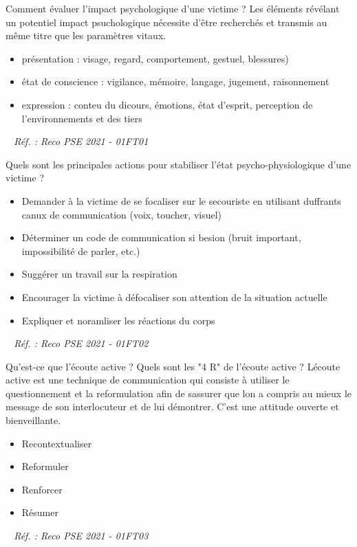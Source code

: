 \documentclass[grid,avery5371,landscape]{flashcards}
\makeatletter
\newcounter{nocarte}
\newcommand{\categ}[1]{%
  \def\@categ{#1}%
  \setcounter{nocarte}{0}%
}
\newcommand{\source}[1]{%
  \medskip
  \itshape%
   ~ \hfill Réf. : #1}
\makeatother
\begin{document}
\color[HTML]{003273}
\categ{PSE}
\begin{flashcard}[bilan]{
 Comment évaluer l'impact psychologique d'une victime ?   }
  Les éléments révélant un potentiel impact psuchologique nécessite d'être recherchés et transmis au même titre que les paramètres vitaux.
\begin{itemize}
        \item présentation : visage, regard, comportement, gestuel, blessures)
        \item état de conscience : vigilance, mémoire, langage, jugement, raisonnement
        \item expression : conteu du dicours, émotions, état d'esprit, perception de l'environnements et des tiers
 \end{itemize}
  \source{Reco PSE 2021 - 01FT01}
\end{flashcard}


\color[HTML]{003273}
\categ{PSE}
\begin{flashcard}[geste]{
 Quels sont les principales actions pour stabiliser l'état psycho-physiologique d'une victime ?   }
  \begin{itemize}
        \item Demander à la victime de se focaliser sur le secouriste en utilisant duffrants canux de communication (voix, toucher, visuel)
        \item Déterminer un code de communication si besion (bruit important, impossibilité de parler, etc.)
        \item Suggérer un travail sur la respiration
        \item Encourager la victime à défocaliser son attention de la situation actuelle
        \item Expliquer et noramliser les réactions du corps
 \end{itemize}
  \source{Reco PSE 2021 - 01FT02}
\end{flashcard}


\color[HTML]{003273}
\categ{PSE}
\begin{flashcard}[geste]{
 Qu'est-ce que l'écoute active ? Quels sont les "4 R" de l'écoute active ?   }
  Lécoute active est une technique de communication qui consiste à utiliser le questionnement et la
reformulation afin de sassurer que lon a compris au mieux le message de son interlocuteur et de lui
démontrer. C'est une attitude ouverte et bienveillante.
\begin{itemize}
        \item Recontextualiser
        \item Reformuler
        \item Renforcer
        \item Résumer
 \end{itemize}
  \source{Reco PSE 2021 - 01FT03}
\end{flashcard}
\end{document}
